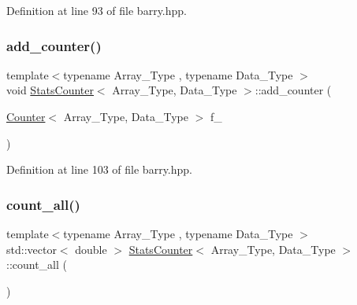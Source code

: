 Definition at line 93 of file barry.\+hpp.

\mbox{\label{classbarry_1_1_stats_counter_ad175dcd2bd30d017881783de546ac333}} 
\subsubsection{\texorpdfstring{add\+\_\+counter()}{add\_counter()}\hspace{0.1cm}{\footnotesize\ttfamily [2/2]}}
{\footnotesize\ttfamily template$<$typename Array\+\_\+\+Type , typename Data\+\_\+\+Type $>$ \\
void \hyperlink{classbarry_1_1_stats_counter}{Stats\+Counter}$<$ Array\+\_\+\+Type, Data\+\_\+\+Type $>$\+::add\+\_\+counter (\begin{DoxyParamCaption}\item[{\hyperlink{classbarry_1_1_counter}{Counter}$<$ Array\+\_\+\+Type, Data\+\_\+\+Type $>$}]{f\+\_\+ }\end{DoxyParamCaption})\hspace{0.3cm}{\ttfamily [inline]}}



Definition at line 103 of file barry.\+hpp.

\mbox{\label{classbarry_1_1_stats_counter_a83bd92031a1499109c98f238221cbd67}} 
\subsubsection{\texorpdfstring{count\+\_\+all()}{count\_all()}}
{\footnotesize\ttfamily template$<$typename Array\+\_\+\+Type , typename Data\+\_\+\+Type $>$ \\
std\+::vector$<$ double $>$ \hyperlink{classbarry_1_1_stats_counter}{Stats\+Counter}$<$ Array\+\_\+\+Type, Data\+\_\+\+Type $>$\+::count\+\_\+all (\begin{DoxyParamCaption}{ }\end{DoxyParamCaption})\hspace{0.3cm}{\ttfamily [inline]}}



